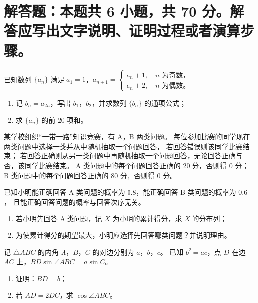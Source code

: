 \documentclass{exam-zh}
\begin{document}
\section{解答题：本题共 6 小题，共 70 分。解答应写出文字说明、证明过程或者演算步骤。}

\begin{problem}[points = 10]
  已知数列 $\{a_n\}$ 满足 $a_1 = 1$，$a_{n+1} =
    \begin{cases}
      a_n + 1, \quad \text{$n$ 为奇数，} \\
      a_n + 2, \quad \text{$n$ 为偶数。}
    \end{cases}$
  \begin{enumerate}
    \item 记 $b_n = a_{2n}$，写出 $b_1$，$b_2$，并求数列 $\{b_n\}$ 的通项公式；
    \item 求 $\{a_n\}$ 的前 $20$ 项和。
  \end{enumerate}
\end{problem}

\begin{problem}[points = 12]
  某学校组织“一带一路”知识竞赛，有 A，B 两类问题。
  每位参加比赛的同学现在两类问题中选择一类并从中随机抽取一个问题回答，
  若回答错误则该同学比赛结束；
  若回答正确则从另一类问题中再随机抽取一个问题回答，无论回答正确与否，该同学比赛结束。
  A 类问题中的每个问题回答正确的 $20$ 分，否则得 $0$ 分；
  B 类问题中的每个问题回答正确的 $80$ 分，否则得 $0$ 分。

  已知小明能正确回答 A 类问题的概率为 $0.8$，能正确回答 B 类问题的概率为 $0.6$，
  且能正确回答问题的概率与回答次序无关。
  \begin{enumerate}
    \item 若小明先回答 A 类问题，记 $X$ 为小明的累计得分，求 $X$ 的分布列；
    \item 为使累计得分的期望最大，小明应选择先回答哪类问题？并说明理由。
  \end{enumerate}
\end{problem}

\begin{problem}[points = 12]
  记 $\triangle ABC$ 的内角 $A$，$B$，$C$ 的对边分别为 $a$，$b$，$c$。
  已知 $b^2 = ac$，点 $D$ 在边 $AC$ 上，$BD \sin\angle ABC = a \sin C$。
  \nopagebreak
  \begin{enumerate}
    \item 证明：$BD = b$；
    \item 若 $AD = 2 DC$，求 $\cos\angle ABC$。
  \end{enumerate}
\end{problem}
\end{document}
